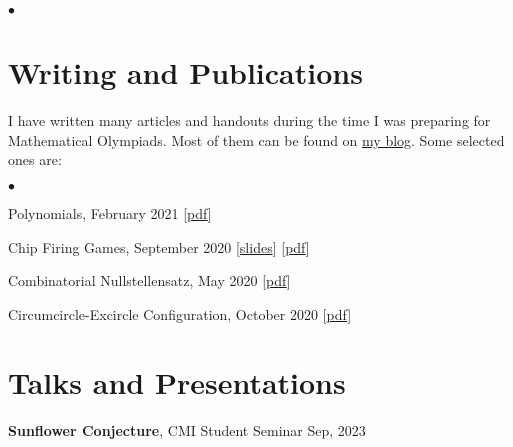 \documentclass[margin,line, 10pt]{res}
\newenvironment{list2}{
  \begin{list}{$\bullet$}{%
      \setlength{\itemsep}{0in}
      \setlength{\parsep}{0in} \setlength{\parskip}{0in}
      \setlength{\topsep}{0in} \setlength{\partopsep}{0in} 
      \setlength{\leftmargin}{0.2in}}}{\end{list}}
\begin{document}
\begin{resume}
\begin{list2}
\end{list2}

\section{\sc Writing and Publications}


\vspace{-.1cm}
I have written many articles and handouts during the time I was preparing for Mathematical Olympiads. Most of them can be found on \href{https://rgtdfg.blogspot.com/p/handouts.html}{my blog}. Some selected ones are:
\begin{list2}
    \item Polynomials, February 2021 \hfill [\href{https://www.dropbox.com/s/yo31nat6z5ggaue/Polynomials.pdf?dl=0}{pdf}]
    \item Chip Firing Games, September 2020 \hfill [\href{https://www.dropbox.com/s/66a3xw6xad35i8y/chip_firing_presentation.pdf?dl=0}{slides}] [\href{https://www.dropbox.com/s/fu0xmn8u42qdhyl/Chip%20Firing.pdf?dl=0}{pdf}]
    \item Combinatorial Nullstellensatz, May 2020 \hfill [\href{https://www.dropbox.com/s/9vjbqeec17hubov/Combo-Null.pdf?dl=0}{pdf}]
    \item Circumcircle-Excircle Configuration, October 2020 \hfill [\href{https://www.dropbox.com/s/qtxwbpe6tffyyo0/circumex.pdf?dl=0}{pdf}]
\end{list2}


\section{\sc Talks and Presentations}



{\bf Sunflower Conjecture}, CMI Student Seminar \hfill Sep, 2023


\end{resume}
\end{document}
